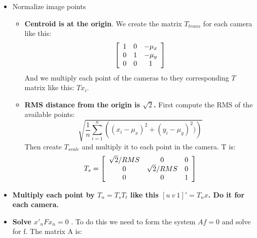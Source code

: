 \documentclass[a4paper,12pt]{article}
\begin{document}
\begin{itemize}
    \item Normalize image points
        \begin{itemize}
            \item \textbf{Centroid is at the origin}. We create the matrix $T_{trans}$ for each
                camera like this:
                \begin{equation}
                    \left [
                    \begin{array}[ ]{c c c}
                        1 & 0 & -\mu_x\\
                        0 & 1 & -\mu_y\\
                        0 & 0 & 1\\
                    \end{array}
                \right ]
                \end{equation}
                And we multiply each point of the cameras to they corresponding $T$ matrix like this:
                $Tx_i$.
            \item \textbf{RMS distance from the origin is $\sqrt{2}$.} First compute the RMS of the
                available points:
                \begin{equation}
                    \sqrt{ \frac{1}{n} \sum_{i=1}^n \left(  (x_i - \mu_x)^2 + (y_i- \mu_y)^2) \right) }
                \end{equation}
                Then create $T_{scale}$ and multiply it to each point in the camera. T is:
                \begin{equation}
                    T_s = \left[ 
                    \begin{array}[]{ccc}
                        \sqrt{2}/RMS & 0 & 0 \\
                        0 & \sqrt{2}/RMS  & 0 \\
                        0 & 0 & 1 
                    \end{array}
                     \right]
                \end{equation}
        \end{itemize}
    \item \textbf{Multiply each point by $T_n = T_sT_t$ like this $[u~ v~ 1]' = T_nx$. Do it for each camera.}
    \item \textbf{Solve $x'_nFx_n = 0$ }. To do this we need to form the system $Af = 0$ and solve for f.
        The matrix A is: \begin{equation}

\end{equation}
\end{itemize}
\end{document}
